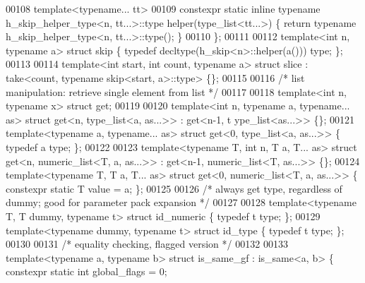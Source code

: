 \begin{DoxyCode}
00108   \textcolor{keyword}{template}<\textcolor{keyword}{typename}... tt>
00109   constexpr \textcolor{keyword}{static} \textcolor{keyword}{inline} \textcolor{keyword}{typename} h\_skip\_helper\_type<n, tt...>::type helper(type\_list<tt...>) \{ \textcolor{keywordflow}{return} \textcolor{keyword}{
      typename} h\_skip\_helper\_type<n, tt...>::type(); \}
00110 \};
00111 
00112 \textcolor{keyword}{template}<\textcolor{keywordtype}{int} n, \textcolor{keyword}{typename} a> \textcolor{keyword}{struct }skip \{ \textcolor{keyword}{typedef} decltype(h\_skip<n>::helper(a())) type; \};
00113 
00114 template<\textcolor{keywordtype}{int} start, \textcolor{keywordtype}{int} count, typename a> struct slice : take<count, typename skip<start, a>::type> \{\};
00115 
00116 \textcolor{comment}{/* list manipulation: retrieve single element from list */}
00117 
00118 \textcolor{keyword}{template}<\textcolor{keywordtype}{int} n, \textcolor{keyword}{typename} x> \textcolor{keyword}{struct }get;
00119 
00120 \textcolor{keyword}{template}<\textcolor{keywordtype}{int} n, \textcolor{keyword}{typename} a, \textcolor{keyword}{typename}... as>               \textcolor{keyword}{struct }get<n, type\_list<a, as...>>   : get<n-1, t
      ype\_list<as...>> \{\};
00121 \textcolor{keyword}{template}<\textcolor{keyword}{typename} a, \textcolor{keyword}{typename}... as>                      \textcolor{keyword}{struct }get<0, type\_list<a, as...>>   \{ \textcolor{keyword}{typedef} a 
      type; \};
00122 
00123 \textcolor{keyword}{template}<\textcolor{keyword}{typename} T, \textcolor{keywordtype}{int} n, T a, T... as>                        \textcolor{keyword}{struct }get<n, numeric\_list<T, a, as...>>  
       : get<n-1, numeric\_list<T, as...>> \{\};
00124 \textcolor{keyword}{template}<\textcolor{keyword}{typename} T, T a, T... as>                               \textcolor{keyword}{struct }get<0, numeric\_list<T, a, as...>>  
       \{ constexpr \textcolor{keyword}{static} T value = a; \};
00125 
00126 \textcolor{comment}{/* always get type, regardless of dummy; good for parameter pack expansion */}
00127 
00128 \textcolor{keyword}{template}<\textcolor{keyword}{typename} T, T dummy, \textcolor{keyword}{typename} t> \textcolor{keyword}{struct }id\_numeric  \{ \textcolor{keyword}{typedef} t type; \};
00129 \textcolor{keyword}{template}<\textcolor{keyword}{typename} dummy, \textcolor{keyword}{typename} t>      \textcolor{keyword}{struct }id\_type     \{ \textcolor{keyword}{typedef} t type; \};
00130 
00131 \textcolor{comment}{/* equality checking, flagged version */}
00132 
00133 \textcolor{keyword}{template}<\textcolor{keyword}{typename} a, \textcolor{keyword}{typename} b> \textcolor{keyword}{struct }is\_same\_gf : is\_same<a, b> \{ constexpr \textcolor{keyword}{static} \textcolor{keywordtype}{int} global\_flags = 0;

\end{DoxyCode}
